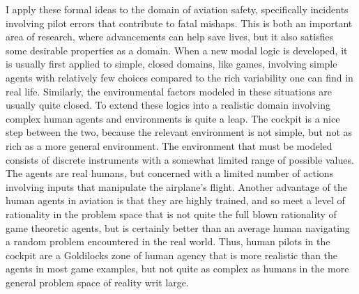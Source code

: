 I apply these formal ideas to the domain of aviation safety, specifically incidents involving pilot errors that contribute to fatal mishaps. This is both an important area of research, where advancements can help save lives, but it also satisfies some desirable properties as a domain. When a new modal logic is developed, it is usually first applied to simple, closed domains, like games, involving simple agents with relatively few choices compared to the rich variability one can find in real life. Similarly, the environmental factors modeled in these situations are usually quite closed. To extend these logics into a realistic domain involving complex human agents and environments is quite a leap. The cockpit is a nice step between the two, because the relevant environment is not simple, but not as rich as a more general environment. The environment that must be modeled consists of discrete instruments with a somewhat limited range of possible values. The agents are real humans, but concerned with a limited number of actions involving inputs that manipulate the airplane's flight. Another advantage of the human agents in aviation is that they are highly trained, and so meet a level of rationality in the problem space that is not quite the full blown rationality of game theoretic agents, but is certainly better than an average human navigating a random problem encountered in the real world. Thus, human pilots in the cockpit are a Goldilocks zone of human agency that is more realistic than the agents in most game examples, but not quite as complex as humans in the more general problem space of reality writ large.

